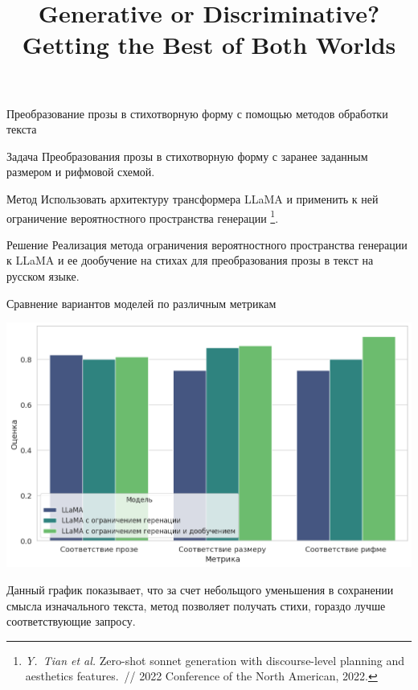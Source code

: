 \documentclass[11pt,pdf,hyperref={unicode}]{beamer}
\title{ Generative or Discriminative?\\
Getting the Best of Both Worlds}
\begin{document}
\setcounter{page}{2}%
\begin{frame}{Преобразование прозы в стихотворную форму с помощью методов обработки текста}

\begin{block}{Задача}
    Преобразования прозы в стихотворную форму с заранее заданным размером и рифмовой схемой.
\end{block}
\begin{block}{Метод}
    Использовать архитектуру трансформера LLaMA и применить к ней ограничение вероятностного пространства генерации
\footnote{\textit{Y.~Tian et al.} Zero-shot sonnet generation with discourse-level planning and aesthetics features.~// 2022 Conference of the North
American, 2022.}.
\end{block}
\begin{block}{Решение} 
 Реализация метода ограничения вероятностного пространства генерации к LLaMA и ее дообучение на стихах для преобразования прозы в текст на русском языке.
\end{block}
\end{frame}
\begin{frame}{Сравнение вариантов моделей по различным метрикам}

\includegraphics[width=1\textwidth]{image.png}   

Данный график показывает, что за счет небольщого уменьшения в сохранении смысла изначального текста, метод позволяет получать стихи, гораздо лучше соответствующие запросу.
\end{frame}
\end{document}
